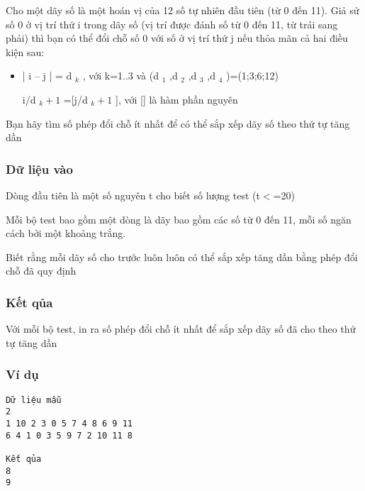 



   Cho một dãy số là một hoán vị của 12 số tự nhiên đầu tiên (từ 0 đến 11). Giả sử số 0 ở vị trí thứ i trong dãy số (vị trí được đánh số từ 0 đến 11, từ trái sang phải) thì bạn có thể đổi chỗ số 0 với số ở vị trí thứ j nếu thỏa mãn cả hai điều kiện sau:  
\begin{itemize}
	\item     | i – j | = d    $_     k    $    , với k=1..3 và (d    $_     1    $    ,d    $_     2    $    ,d    $_     3    $    ,d    $_     4    $    )=(1;3;6;12)    


	\item     [i/d    $_     k+1    $    ]=[j/d    $_     k+1    $    ], với [] là hàm phần nguyên   
\end{itemize}

   Bạn hãy tìm số phép đổi chỗ ít nhất để có thể sắp xếp dãy số theo thứ tự tăng dần  

\subsubsection{   Dữ liệu vào  }

   Dòng đầu tiên là một số nguyên t cho biết số lượng test (t$<$=20)  

   Mỗi bộ test bao gồm một dòng là dãy bao gồm các số từ 0 đến 11, mỗi số ngăn cách bởi một khoảng trắng.  

   Biết rằng mỗi dãy số cho trước luôn luôn có thể sắp xếp tăng dần bằng phép đổi chỗ đã quy định  

\subsubsection{   Kết qủa  }

   Với mỗi bộ test, in ra số phép đổi chỗ ít nhất để sắp xếp dãy số đã cho theo thứ tự tăng dần  

\subsubsection{   Ví dụ  }
\begin{verbatim}
Dữ liệu mẫu
2
1 10 2 3 0 5 7 4 8 6 9 11
6 4 1 0 3 5 9 7 2 10 11 8

Kết qủa
8
9
\end{verbatim}